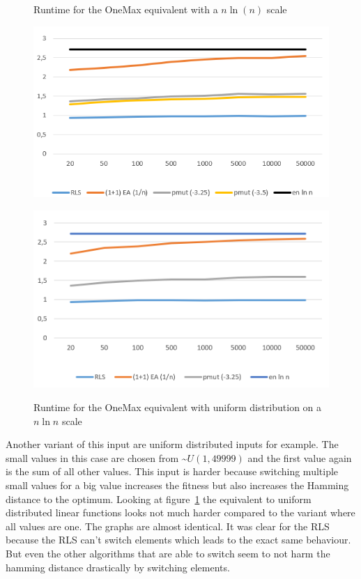 \begin{figure}[h]
      \centering
      \begin{minipage}[b]{0.45\textwidth}
            \caption{Runtime for the OneMax equivalent with a $n\ln(n)$ scale}
            \includegraphics[width=\textwidth]{figures/images/oneMaxMultipleN.png}\label{fig:onemaxNlogNBound}
      \end{minipage}
      \hspace{0.75cm}
      \begin{minipage}[b]{0.45\textwidth}
            \caption{Runtime for the OneMax equivalent with uniform distribution on a $n\ln n$ scale}
            \includegraphics[width=\textwidth]{figures/images/oneMaxUniformMultipleN.png}\label{fig:onemaxUniformNlogNBound}
      \end{minipage}
\end{figure}

Another variant of this input are uniform distributed inputs for example.
The small values in this case are chosen from \textasciitilde$U(1,49999)$ and the first value again is the sum of all other values.
This input is harder because switching multiple small values for a big value increases the fitness but also increases the Hamming distance to the optimum. Looking at figure~\ref{fig:onemaxUniformNlogNBound} the equivalent to uniform distributed linear functions looks not much harder compared to the variant where all values are one.
The graphs are almost identical.
It was clear for the RLS because the RLS can't switch elements which leads to the exact same behaviour.
But even the other algorithms that are able to switch seem to not harm the hamming distance drastically by switching elements.

